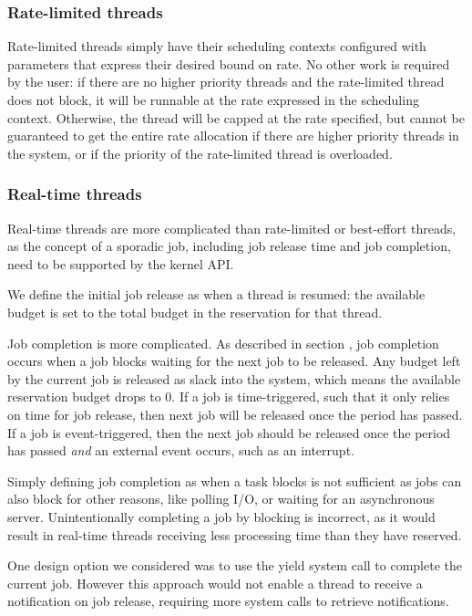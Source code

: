 \subsubsection{Rate-limited threads}

Rate-limited threads simply have their scheduling contexts configured with parameters that express their desired bound on rate.
No other work is required by the user: if there are no higher priority threads and the rate-limited thread does not block, it will be runnable at the rate expressed in the scheduling context.
Otherwise, the thread will be capped at the rate specified, but cannot be guaranteed to get the entire rate allocation if there are higher priority threads in the system, or if the priority of the rate-limited thread is overloaded.

\subsubsection{Real-time threads}

Real-time threads are more complicated than rate-limited or best-effort threads, as the concept of a sporadic job, including job release time and job completion, need to be supported by the kernel API.

We define the initial job release as when a thread is resumed: the available budget is set to the total budget in the reservation for that thread.

Job completion is more complicated.
As described in section , job completion occurs when a job blocks waiting for the next job to be released.
Any budget left by the current job is released as slack into the system, which means the available reservation budget drops to 0.
If a job is time-triggered, such that it only relies on time for job release, then next job will be released once the period has passed.
If a job is event-triggered, then the next job should be released once the period has passed \textit{and} an external event occurs, such as an interrupt.

Simply defining job completion as when a task blocks is not sufficient as jobs can also block for other reasons, like polling I/O, or waiting for an asynchronous server.
Unintentionally completing a job by blocking is incorrect, as it would result in real-time threads receiving less processing time than they have reserved.

One design option we considered was to use the yield system call to complete the current job.
However this approach would not enable a thread to receive a notification on job release, requiring more system calls to retrieve notifications.

